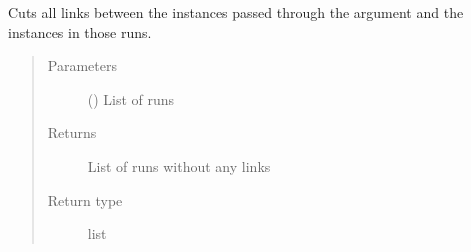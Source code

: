 \documentclass[letterpaper,10pt,english]{sphinxmanual}
\begin{document}
\begin{fulllineitems}
\begin{fulllineitems}
\label{\detokenize{polo.utils:polo.utils.io_utils.RunLinker.unlink_runs_completely}}
Cuts all links between the {\hyperref[\detokenize{polo.crystallography:polo.crystallography.run.HWIRun}]{}} instances
passed through the  argument and the
{\hyperref[\detokenize{polo.crystallography:polo.crystallography.image.Image}]{}} instances
in those runs.
\begin{quote}\begin{description}
\item[{Parameters}] \leavevmode
{} () \textendash{} List of runs

\item[{Returns}] \leavevmode
List of runs without any links

\item[{Return type}] \leavevmode
list

\end{description}\end{quote}

\end{fulllineitems}


\end{fulllineitems}

\end{document}

